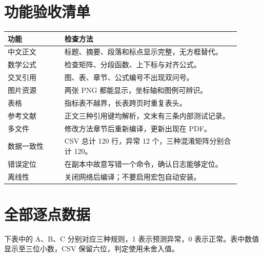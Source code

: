 \section{功能验收清单}
\begin{longtable}{p{0.22\linewidth}p{0.68\linewidth}}
\toprule 功能 & 检查方法\\\midrule\endhead
中文正文 & 标题、摘要、段落和标点显示完整，无方框替代。\\
数学公式 & 检查矩阵、分段函数、上下标与对齐公式。\\
交叉引用 & 图、表、章节、公式编号不出现双问号。\\
图片资源 & 两张 PNG 都能显示，坐标轴和图例可辨识。\\
表格 & 指标表不越界，长表跨页时重复表头。\\
参考文献 & 正文三种引用键均解析，文末有三条内部测试记录。\\
多文件 & 修改方法章节后重新编译，更新出现在 PDF。\\
数据一致性 & CSV 总计 120 行，异常 12 个，三种混淆矩阵分别合计 120。\\
错误定位 & 在副本中故意写错一个命令，确认日志能够定位。\\
离线性 & 关闭网络后编译；不要启用宏包自动安装。\\\bottomrule
\end{longtable}

\section{全部逐点数据}
下表中的 A、B、C 分别对应三种规则，1 表示预测异常，0 表示正常。表中数值显示至三位小数，CSV 保留六位，判定使用未舍入值。

